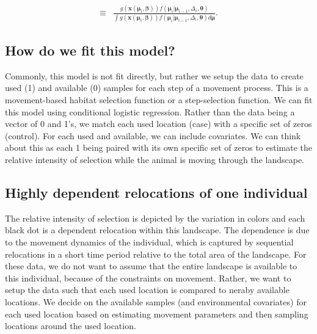 \documentclass[12pt]{article}
\begin{document}
\begin{align*}
[\boldsymbol{\mu}_{i}|\boldsymbol{\mu}_{i-1} \boldsymbol{\beta}, \boldsymbol{\theta}] \equiv &  \frac{g(\textbf{x}(\boldsymbol{\mu}_{i}, \boldsymbol{\beta}))f(\boldsymbol{\mu}_{i}|\boldsymbol{\mu}_{i-1},\Delta_{i},\boldsymbol{\theta})}{\int g(\textbf{x}(\boldsymbol{\mu}_{i}, \boldsymbol{\beta}))f(\boldsymbol{\mu}_{i}|\boldsymbol{\mu}_{i-1},\Delta_{i},\boldsymbol{\theta})d\boldsymbol{\mu}}.
\end{align*}

\subsection{How do we fit this model?}

Commonly, this model is not fit directly, but rather we setup the data to create used (1) and available (0) samples for each step of a movement process. This is a movement-based habitat selection function or a step-selection function. We can fit this model using conditional logistic regression. Rather than the data being a vector of 0 and 1's, we match each used location (case) with a specific set of zeros (control). For each used and available, we can include covariates. We can think about this as each 1 being paired with its own specific set of zeros to estimate the relative intensity of selection while the animal is moving through the landscape. 

\subsection{Highly dependent relocations of one individual}

The relative intensity of selection is depicted by the variation in colors and each black dot is a dependent relocation within this landscape. The dependence is due to the movement dynamics of the individual, which is captured by sequential relocations in a short time period relative to the total area of the landscape. For these data, we do not want to assume that the entire landscape is available to this individual, because of the constraints on movement. Rather, we want to setup the data such that each used location is compared to neraby available locations. We decide on the available samples (and environmental covariates) for each used location based on estimating movement parameters and then sampling locations around the used location. 
\end{document}
